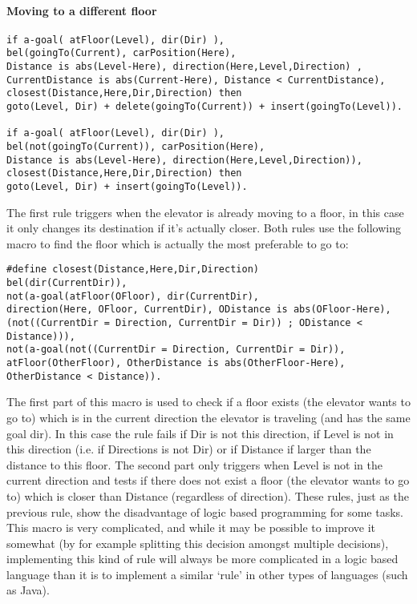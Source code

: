 \documentclass[a4paper,11pt]{article}
\begin{document}
\paragraph*{Moving to a different floor}
\begin{verbatim}
if a-goal( atFloor(Level), dir(Dir) ),
bel(goingTo(Current), carPosition(Here), 
Distance is abs(Level-Here), direction(Here,Level,Direction) , 
CurrentDistance is abs(Current-Here), Distance < CurrentDistance),
closest(Distance,Here,Dir,Direction) then 
goto(Level, Dir) + delete(goingTo(Current)) + insert(goingTo(Level)).

if a-goal( atFloor(Level), dir(Dir) ),
bel(not(goingTo(Current)), carPosition(Here), 
Distance is abs(Level-Here), direction(Here,Level,Direction)),
closest(Distance,Here,Dir,Direction) then
goto(Level, Dir) + insert(goingTo(Level)).
\end{verbatim}

The first rule triggers when the elevator is already moving to a floor, in this case it only changes its destination if it's actually closer. Both rules use the following macro to find the floor which is actually the most preferable to go to:

\begin{verbatim}
#define closest(Distance,Here,Dir,Direction)
bel(dir(CurrentDir)), 
not(a-goal(atFloor(OFloor), dir(CurrentDir), 
direction(Here, OFloor, CurrentDir), ODistance is abs(OFloor-Here),
(not((CurrentDir = Direction, CurrentDir = Dir)) ; ODistance < Distance))),
not(a-goal(not((CurrentDir = Direction, CurrentDir = Dir)), 
atFloor(OtherFloor), OtherDistance is abs(OtherFloor-Here), OtherDistance < Distance)).
\end{verbatim}

The first part of this macro is used to check if a floor exists (the elevator wants to go to) which is in the current direction the elevator is traveling (and has the same goal dir). In this case the rule fails if Dir is not this direction, if Level is not in this direction (i.e. if Directions is not Dir) or if Distance if larger than the distance to this floor. The second part only triggers when Level is not in the current direction and tests if there does not exist a floor (the elevator wants to go to) which is closer than Distance (regardless of direction).
\newline\newline
These rules, just as the previous rule, show the disadvantage of logic based programming for some tasks. This macro is very complicated, and while it may be possible to improve it somewhat (by for example splitting this decision amongst multiple decisions), implementing this kind of rule will always be more complicated in a logic based language than it is to implement a similar `rule' in other types of languages (such as Java).
\end{document}
